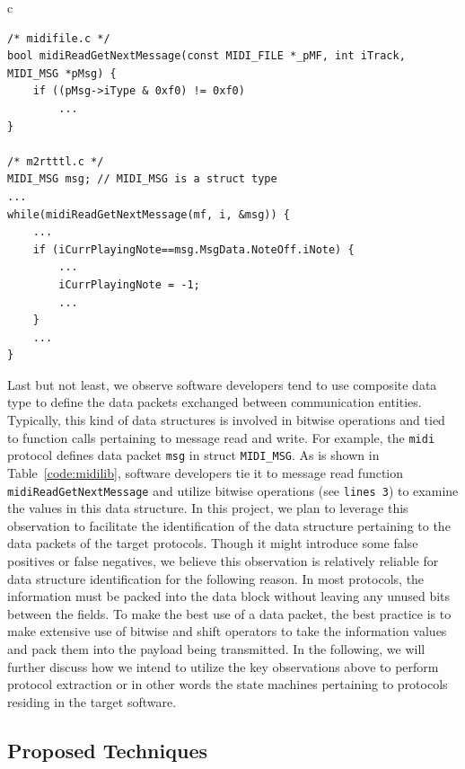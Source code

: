 \begin{table}
\centering
\begin{tabular}{c}
\hspace{12pt}

\begin{lstlisting}  
/* midifile.c */
bool midiReadGetNextMessage(const MIDI_FILE *_pMF, int iTrack, MIDI_MSG *pMsg) {
	if ((pMsg->iType & 0xf0) != 0xf0)
		...
}

/* m2rtttl.c */
MIDI_MSG msg; // MIDI_MSG is a struct type
... 
while(midiReadGetNextMessage(mf, i, &msg)) {
	...
	if (iCurrPlayingNote==msg.MsgData.NoteOff.iNote) {
		...
		iCurrPlayingNote = -1;
		...
	}
	...
}
\end{lstlisting}

\end{tabular}
\caption{The code fragments indicating the implementation of midi protocol.}
\label{code:midilib}
\end{table} 

Last but not least, we observe software developers tend to use composite data
type to define the data packets exchanged between communication entities.
Typically, this kind of data structures is involved in bitwise operations and
tied to function calls pertaining to message read and write. For example, the
\texttt{midi} protocol defines data packet \texttt{msg} in struct
\texttt{MIDI\_MSG}. As is shown in Table~\ref{code:midilib}, software developers
tie it to message read function \texttt{midiReadGetNextMessage} and utilize
bitwise operations (see \texttt{lines 3}) to examine the values in this data
structure. In this project, we plan to leverage this observation to facilitate
the identification of the data structure pertaining to the data packets of the
target protocols. Though it might introduce some false positives or false
negatives, we believe this observation is relatively reliable for data structure
identification for the following reason. In most protocols, the information must
be packed into the data block without leaving any unused bits between the
fields. To make the best use of a data packet, the best practice is to make
extensive use of bitwise and shift operators to take the information values and
pack them into the payload being transmitted. In the following, we will further
discuss how we intend to utilize the key observations above to perform protocol
extraction or in other words the state machines pertaining to protocols residing
in the target software.

\subsection{Proposed Techniques}

